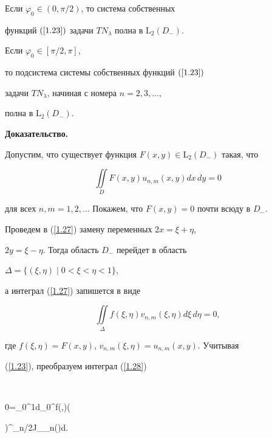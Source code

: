\begin{thm}


Если $\varphi_0\in(0,\pi/2)$, то система собственных 


функций $(\ref{1.23})$ задачи $TN_\lambda$ полна в ${\mathrm L}_2(D_-)$. 


Если $\varphi_0\in[\pi/2,\pi]$,


то подсистема системы собственных функций $(\ref{1.23})$


задачи $TN_\lambda$, начиная с номера $n=2,3,\dotsc$,


полна в ${\mathrm L}_2(D_-)$. 


\end{thm}





{\bf Доказательство.}


Допустим, что существует функция $F(x,y)\in {\mathrm L}_2


(D_-)$ такая, что


\begin{equation}


\iint\limits_D F(x,y)u_{n,m}(x,y)dx\,dy=0\label{1.27}


\end{equation}


для всех $n, m=1,2,\dotsc$ Покажем, что $F(x,y)=0$ почти всюду в $D_-$.


Проведем в (\ref{1.27}) замену переменных $2x=\xi+\eta$,


$2y=\xi-\eta$. Тогда область $D_-$ перейдет в область


$\Delta=\{(\xi,\eta)\mid 0<\xi<\eta<1\}$,


а интеграл (\ref{1.27}) запишется в виде


\begin{equation}


\iint\limits_\Delta f(\xi,\eta)v_{n,m}(\xi,\eta)d\xi


\,d\eta=0,\label{1.28}


\end{equation}


где $f(\xi,\eta)=F(x,y)$, $v_{n,m}(\xi,\eta)=u_{n,m}(x,y)$. Учитывая 


(\ref{1.23}), преобразуем интеграл (\ref{1.28})


$$


0=\int_0^1d\eta\int_0^\eta f(\xi,\eta)\left(\frac{\xi}{\eta}


\right)^{\mu_n/2}J_{\mu_n}()d\xi.



